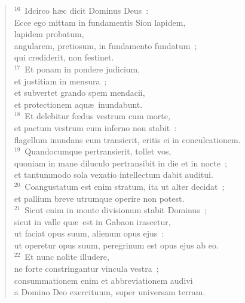 \begin{verse}
${}^{16}$~Idcirco h\ae c dicit Dominus Deus~:\\ Ecce ego mittam in fundamentis Sion lapidem,\\ lapidem probatum,\\ angularem, pretiosum, in fundamento fundatum~;\\ qui crediderit, non festinet.\\
${}^{17}$~Et ponam in pondere judicium,\\ et justitiam in mensura~;\\ et subvertet grando spem mendacii,\\ et protectionem aqu\ae\ inundabunt.\\
${}^{18}$~Et delebitur fœdus vestrum cum morte,\\ et pactum vestrum cum inferno non stabit~:\\ flagellum inundans cum transierit, eritis ei in conculcationem.\\
${}^{19}$~Quandocumque pertransierit, tollet vos,\\ quoniam in mane diluculo pertransibit in die et in nocte~;\\ et tantummodo sola vexatio intellectum dabit auditui.\\
${}^{20}$~Coangustatum est enim stratum, ita ut alter decidat~;\\ et pallium breve utrumque operire non potest.\\
${}^{21}$~Sicut enim in monte divisionum stabit Dominus~;\\ sicut in valle qu\ae\ est in Gabaon irascetur,\\ ut faciat opus suum, alienum opus ejus~:\\ ut operetur opus suum, peregrinum est opus ejus ab eo.\\
${}^{22}$~Et nunc nolite illudere,\\ ne forte constringantur vincula vestra~;\\ consummationem enim et abbreviationem audivi\\ a Domino Deo exercituum, super universam terram.\end{verse}


